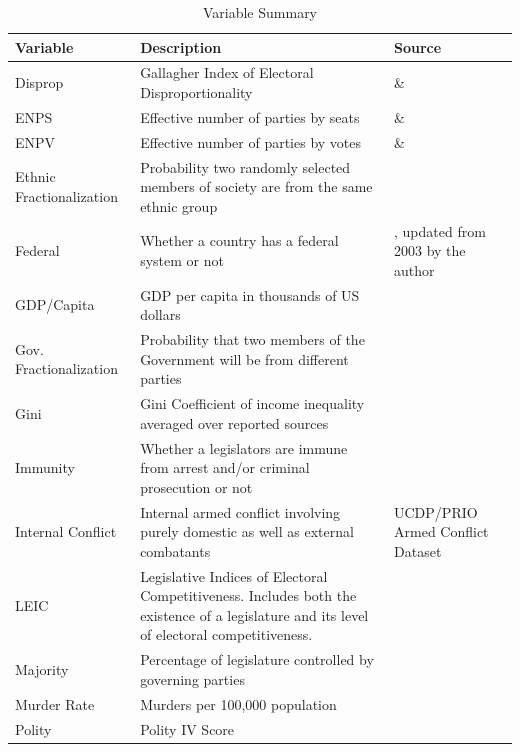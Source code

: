 \documentclass[a4paper]{article}\usepackage[]{graphicx}\usepackage[]{color}
\begin{document}
\begin{table}[!h]
    \begin{center}
    \caption{Variable Summary}
    \label{var_summary}
    \begin{tabular}{l m{7cm} m{3.5cm}}

            \hline
            Variable & Description & Source \\
            \hline \hline
            Disprop & Gallagher Index of Electoral Disproportionality & \cite{Gallagher2012} \& \cite{Carey2011} \\
            ENPS & Effective number of parties by seats & \cite{Gallagher2012} \& \cite{Carey2011} \\
            ENPV & Effective number of parties by votes & \cite{Gallagher2012} \& \cite{Carey2011} \\
            Ethnic Fractionalization & Probability two randomly selected members of society are from the same ethnic group & \cite{Alesina2003} \\
            Federal & Whether a country has a federal system or not & \cite{Carey2011}, updated from 2003 by the author \\
            GDP/Capita & GDP per capita in thousands of US dollars & \cite{WorldBank2011} \\
            Gov. Fractionalization & Probability that two members of the Government will be from different parties & \cite{DPI2001} \\
            Gini & Gini Coefficient of income inequality averaged over reported sources & \cite{UNU2008} \\
            Immunity & Whether a legislators are immune from arrest and/or criminal prosecution or not & \cite{Fish2009} \\
            Internal Conflict & Internal armed conflict involving purely domestic as well as external combatants & UCDP/PRIO Armed Conflict Dataset \citep{Themner2014} \\
            LEIC & Legislative Indices of Electoral Competitiveness. Includes both the existence of a legislature and its level of electoral competitiveness. & \cite{DPI2001} \\
            Majority & Percentage of legislature controlled by governing parties & \cite{DPI2001} \\
            Murder Rate & Murders per 100,000 population & \cite{UNMurder2013} \\
            Polity & Polity IV Score & \cite{Marshall2009} \\

\end{tabular}
\end{center}
\end{table}
\end{document}
